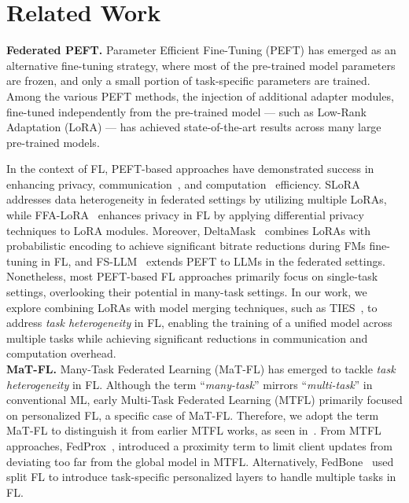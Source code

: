 \section{Related Work}
\noindent \textbf{Federated PEFT.} Parameter Efficient Fine-Tuning (PEFT) has emerged as an alternative fine-tuning strategy, where most of the pre-trained model parameters are frozen, and only a small portion of task-specific parameters are trained. Among the various PEFT methods, the injection of additional adapter modules, fine-tuned independently from the pre-trained model — such as Low-Rank Adaptation (LoRA)\cite{hu2021loralowrankadaptationlarge} — has achieved state-of-the-art results across many large pre-trained models. 

In the context of FL, PEFT-based approaches have demonstrated success in enhancing privacy\cite{sun2024improvingloraprivacypreservingfederated}, communication~\cite{tsouvalas2023federatedfinetuningfoundationmodels}, and computation~\cite{babakniya2023slorafederatedparameterefficient} efficiency. SLoRA~\cite{babakniya2023slorafederatedparameterefficient} addresses data heterogeneity in federated settings by utilizing multiple LoRAs, while FFA-LoRA~\cite{sun2024improvingloraprivacypreservingfederated} enhances privacy in FL by applying differential privacy techniques to LoRA modules. Moreover, DeltaMask~\cite{tsouvalas2023federatedfinetuningfoundationmodels} combines LoRAs with probabilistic encoding to achieve significant bitrate reductions during FMs fine-tuning in FL, and FS-LLM~\cite{kuang2023federatedscopellmcomprehensivepackagefinetuning} extends PEFT to LLMs in the federated settings. Nonetheless, most PEFT-based FL approaches primarily focus on single-task settings, overlooking their potential in many-task settings. In our work, we explore combining LoRAs with model merging techniques, such as TIES~\cite{yadav2023tiesmergingresolvinginterferencemerging}, to address \textit{task heterogeneity} in FL, enabling the training of a unified model across multiple tasks while achieving significant reductions in communication and computation overhead. \\

\noindent \textbf{MaT-FL.} Many-Task Federated Learning (MaT-FL) has emerged to tackle \textit{task heterogeneity} in FL. Although the term ``\textit{many-task}'' mirrors ``\textit{multi-task}'' in conventional ML, early Multi-Task Federated Learning (MTFL) primarily focused on personalized FL, a specific case of MaT-FL. Therefore, we adopt the term MaT-FL to distinguish it from earlier MTFL works, as seen in~\cite{10208649,muhamed2024fed,zhuang2023mas}. From MTFL approaches, FedProx~\cite{li2020federatedoptimizationheterogeneousnetworks}, introduced a proximity term to limit client updates from deviating too far from the global model in MTFL. Alternatively, FedBone~\cite{chen2023fedbone} used split FL to introduce task-specific personalized layers to handle multiple tasks in FL.

